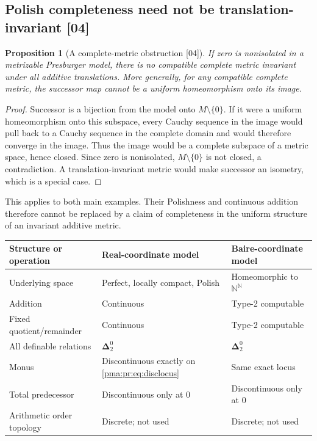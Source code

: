 \documentclass[11pt]{article}
\numberwithin{equation}{section}
\newtheorem{proposition}[proposition]{Proposition}
\theoremstyle{definition}
\theoremstyle{remark}
\newcommand{\N}{\mathbb N}
\newcommand{\Baire}{\N^{\N}}
\newcommand{\src}[1]{\textup{\textsf{\small[#1]}}}
\begin{document}
\subsection{Polish completeness need not be translation-invariant \src{04}}\label{pma:pr:sec:invmetric}

\begin{proposition}[A complete-metric obstruction \src{04}]\label{pma:pr:prop:invariantmetric}
If zero is nonisolated in a metrizable Presburger model, there is no
compatible complete metric invariant under all additive translations.
More generally, for any compatible complete metric, the successor map
cannot be a uniform homeomorphism onto its image.
\end{proposition}

\begin{proof}
Successor is a bijection from the model onto $M\setminus\{0\}$.
If it were a uniform homeomorphism onto this subspace, every Cauchy sequence
in the image would pull back to a Cauchy sequence in the complete domain
and would therefore converge in the image. Thus the image would be a
complete subspace of a metric space, hence closed. Since zero is
nonisolated, $M\setminus\{0\}$ is not closed, a contradiction. A
translation-invariant metric would make successor an isometry, which is
a special case.
\end{proof}

This applies to both main examples. Their Polishness and continuous
addition therefore cannot be replaced by a claim of completeness in the
uniform structure of an invariant additive metric.

\begin{center}
\begin{tabularx}{\textwidth}{@{}lXX@{}}
\toprule
Structure or operation & Real-coordinate model & Baire-coordinate model\\
\midrule
Underlying space & Perfect, locally compact, Polish & Homeomorphic to $\Baire$\\
Addition & Continuous & Type-2 computable\\
Fixed quotient/remainder & Continuous & Type-2 computable\\
All definable relations & $\boldsymbol\Delta^0_2$ & $\boldsymbol\Delta^0_2$\\
Monus & Discontinuous exactly on \eqref{pma:pr:eq:disclocus} & Same exact locus\\
Total predecessor & Discontinuous only at $0$ & Discontinuous only at $0$\\
Arithmetic order topology & Discrete; not used & Discrete; not used\\
\bottomrule
\end{tabularx}
\end{center}
\end{document}
